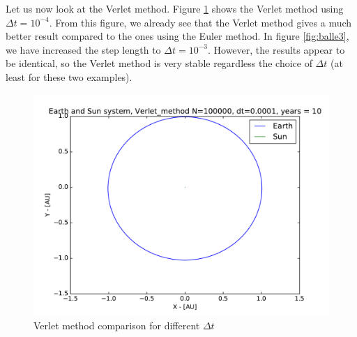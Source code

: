 \documentclass[12pt]{article}
\begin{document}

Let us now look at the Verlet method. Figure \ref{fig:balle2} shows the Verlet method using $\Delta t = 10^{-4}$. From this figure, we already see that the Verlet method gives a much better result compared to the ones using the Euler method. In figure \ref{fig:balle3}, we have increased the step length to $\Delta t = 10^{-3}$. However, the results appear to be identical, so the Verlet method is very stable regardless the choice of $\Delta t$ (at least for these two examples).
\begin{figure}[!h]
\centering
\includegraphics[width=\linewidth]{Plots/Earth_Sun_Verlet_method.pdf}
\caption{Verlet method comparison for different $\Delta t$}
\label{fig:balle2}
\end{figure}
\end{document}
